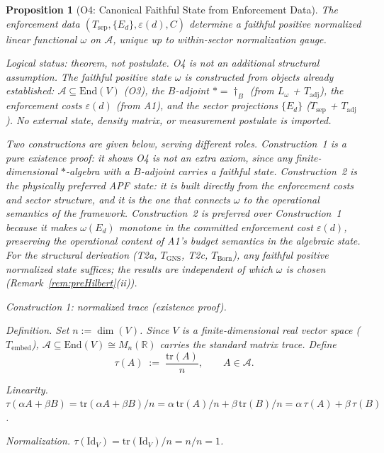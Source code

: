 \documentclass[11pt,a4paper]{article}
\newtheorem{proposition}[theorem]{Proposition}
\theoremstyle{definition}
\newcommand{\eps}{\varepsilon}
\newcommand{\End}{\mathrm{End}}
\newcommand{\tr}{\mathrm{tr}}
\begin{document}
\begin{proposition}[O4: Canonical Faithful State from Enforcement Data]\label{prop:O4}
The enforcement data $(T_{\mathrm{sep}}, \{E_d\}, \eps(d), C)$ determine a faithful positive normalized linear functional $\omega$ on $\mathcal{A}$, unique up to within-sector normalization gauge.

\smallskip\noindent\textit{Logical status: theorem, not postulate.}  O4 is not an additional structural assumption.  The faithful positive state $\omega$ is \emph{constructed} from objects already established: $\mathcal{A} \subseteq \End(V)$ (O3), the $B$-adjoint $* = \dagger_B$ (from $L_\omega$ + $T_{\mathrm{adj}}$), the enforcement costs $\eps(d)$ (from A1), and the sector projections $\{E_d\}$ ($T_{\mathrm{sep}}$ + $T_{\mathrm{adj}}$).  No external state, density matrix, or measurement postulate is imported.

Two constructions are given below, serving different roles.  Construction~1 is a pure existence proof: it shows O4 is not an extra axiom, since any finite-dimensional $*$-algebra with a $B$-adjoint carries a faithful state.  Construction~2 is the physically preferred APF state: it is built directly from the enforcement costs and sector structure, and it is the one that connects $\omega$ to the operational semantics of the framework.  Construction~2 is preferred over Construction~1 because it makes $\omega(E_d)$ monotone in the committed enforcement cost $\eps(d)$, preserving the operational content of A1's budget semantics in the algebraic state.  For the structural derivation (T2a, $T_{\mathrm{GNS}}$, T2c, $T_{\mathrm{Born}}$), any faithful positive normalized state suffices; the results are independent of which $\omega$ is chosen (Remark~\ref{rem:preHilbert}(ii)).

\medskip\noindent\textit{Construction 1: normalized trace (existence proof).}

\smallskip\noindent\textit{Definition.}  Set $n := \dim(V)$.  Since $V$ is a finite-dimensional real vector space ($T_{\mathrm{embed}}$), $\mathcal{A} \subseteq \End(V) \cong M_n(\mathbb{R})$ carries the standard matrix trace.  Define
\[
\tau(A) \;:=\; \frac{\tr(A)}{n}, \qquad A \in \mathcal{A}.
\]

\noindent\textit{Linearity.}  $\tau(\alpha A + \beta B) = \tr(\alpha A + \beta B)/n = \alpha\,\tr(A)/n + \beta\,\tr(B)/n = \alpha\,\tau(A) + \beta\,\tau(B)$.

\noindent\textit{Normalization.}  $\tau(\mathrm{Id}_V) = \tr(\mathrm{Id}_V)/n = n/n = 1$.


\end{proposition}
\end{document}

